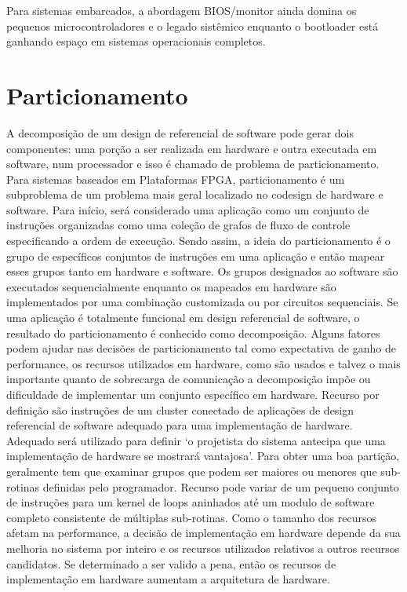 Para sistemas embarcados, a abordagem BIOS/monitor ainda domina os pequenos microcontroladores e o legado sistêmico enquanto o bootloader está ganhando espaço em sistemas operacionais completos.

\chapter{Particionamento}
A decomposição de um design de referencial de software pode gerar dois componentes: uma porção a ser realizada em hardware e outra executada em software, num processador e isso é chamado de problema de particionamento. Para sistemas baseados em Plataformas FPGA, particionamento é um subproblema de um problema mais geral localizado no codesign de hardware e software. 
Para início, será considerado uma aplicação como um conjunto de instruções organizadas como uma coleção de grafos de fluxo de controle especificando a ordem de execução. Sendo assim, a ideia do particionamento é o grupo de específicos conjuntos de instruções em uma aplicação e então mapear esses grupos tanto em hardware e software. Os grupos designados ao software são executados sequencialmente enquanto os mapeados em hardware são implementados por uma combinação customizada ou por circuitos sequenciais. Se uma aplicação é totalmente funcional em design referencial de software, o resultado do particionamento é conhecido como decomposição. Alguns fatores podem ajudar nas decisões de particionamento tal como expectativa de ganho de performance, os recursos utilizados em hardware, como são usados e talvez o mais importante quanto de sobrecarga de comunicação a decomposição impõe ou dificuldade de implementar um conjunto específico em hardware.
Recurso por definição são instruções de um cluster conectado de aplicações de design referencial de software adequado para uma implementação de hardware. Adequado será utilizado para definir `o projetista do sistema antecipa que uma implementação de hardware se mostrará vantajosa’. Para obter uma boa partição, geralmente tem que examinar grupos que podem ser maiores ou menores que sub-rotinas definidas pelo programador. Recurso pode variar de um pequeno conjunto de instruções para um kernel de loops aninhados até um modulo de software completo consistente de múltiplas sub-rotinas. Como o tamanho dos recursos afetam na performance, a decisão de implementação em hardware depende da sua melhoria no sistema por inteiro e os recursos utilizados relativos a outros recursos candidatos. Se determinado a ser valido a pena, então os recursos de implementação em hardware aumentam a arquitetura de hardware. 
